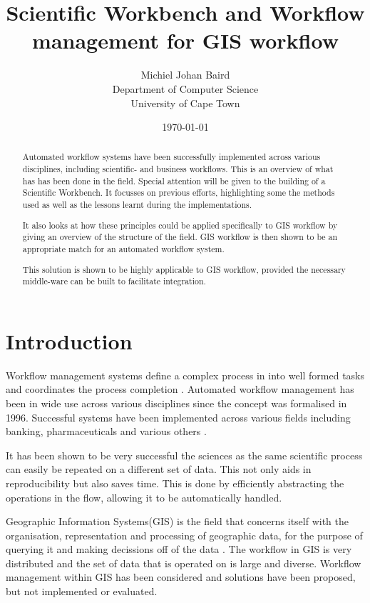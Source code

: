 \documentclass[11pt,twocolumn]{article}
\title{Scientific Workbench and Workflow management for GIS workflow}
\author{
    Michiel Johan Baird \\
        Department of Computer Science \\
        University of Cape Town
}
\date{\today}
\begin{document}
\maketitle
\begin{abstract}
    Automated workflow systems have been successfully implemented
    across various disciplines, including scientific- and business
    workflows. This is an overview of what has has been done
    in the field. Special attention will be given
    to the building of a Scientific Workbench. It focusses on previous efforts, highlighting some the methods used
    as well as the lessons learnt during the implementations.

    It also looks at how these principles could be applied
    specifically to GIS workflow by giving an overview of the
    structure of the field. GIS workflow is then shown to be
    an appropriate match for an automated workflow system.

    This solution is shown to be highly applicable
    to GIS workflow, provided the necessary middle-ware can be built
    to facilitate integration.
\end{abstract}
\section{Introduction}
    Workflow management systems define a complex process in
    into well formed tasks and coordinates the process
    completion \cite{1245778}.
    Automated workflow management has been in wide use across
    various disciplines since the concept was formalised in
    1996\cite{springerlink:10.1007/BF00136712}. Successful systems
    have been implemented across various fields including banking,
    pharmaceuticals and various others
    \cite{Brahe:2007:SWW:1316624.1316661,5407993}.

    It has been shown to be very successful the
    sciences as the same scientific process can easily
    be repeated on
    a different set of data\cite{4721191}.
    This not only aids in reproducibility but also saves time.
    This is done by efficiently
    abstracting the operations in the flow, allowing it
    to be automatically handled.

    Geographic Information Systems(GIS) is the field that
    concerns itself with the organisation, representation
    and processing of geographic data, for the purpose of
    querying it and making decissions off of the data
    \cite{DiMartino:2007:TAG:1341012.1341081}. The
    workflow in GIS is very distributed and the set
    of data that is operated on is large and diverse.
    Workflow management within GIS has been considered
    and solutions have been proposed, but not implemented
    or evaluated\cite{Migliorini:2011:WTG:1999320.1999356}.
\end{document}
